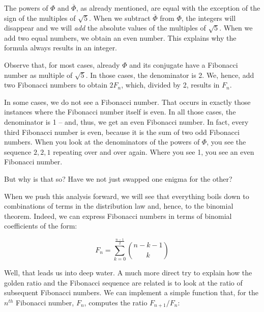 \documentclass[tikz]{scrreprt}
\begin{document}
The powers of $\Phi$ and $\overline{\Phi}$, as already mentioned,
are equal with the exception of the sign of the multiples of $\sqrt{5}$.
When we subtract $\overline{\Phi}$ from $\Phi$, the integers will
disappear and we will \emph{add} the absolute values of the multiples
of $\sqrt{5}$. When we add two equal numbers, we obtain an even number.
This explains why the formula always results in an integer.

Observe that, for most cases, already $\Phi$ and its conjugate
have a Fibonacci number as multiple of $\sqrt{5}$. In those cases,
the denominator is 2. We, hence, add two Fibonacci numbers to obtain
$2F_n$, which, divided by 2, results in $F_n$.

In some cases, we do not see a Fibonacci number. That occurs in
exactly those instances where the Fibonacci number itself is even.
In all those cases,
the denominator is 1 -- and, thus, we get an even Fibonacci number.
In fact, every third Fibonacci number is even, 
because it is the sum
of two odd Fibonacci numbers.
When you look at the denominators of the powers of $\Phi$,
you see the sequence $2, 2, 1$ repeating over and over again.
Where you see 1, you see an even Fibonacci number.

But why is that so? Have we not just swapped one enigma
for the other? 

When we push this analysis forward, we will see
that everything boils down to combinations of terms
in the distribution law and, hence, to the binomial theorem.
Indeed, we can express Fibonacci numbers in terms of 
binomial coefficients of the form:

\begin{equation}
F_n = \sum_{k=0}^{\frac{n-1}{2}}{\binom{n-k-1}{k}}
\end{equation}

Well, that leads us into deep water.
A much more direct try to explain 
how the golden ratio and
the Fibonacci sequence are related
is to look at the ratio of subsequent
Fibonacci numbers.
We can implement a simple function
that, for the $n^{th}$ Fibonacci number, $F_n$,
computes the ratio $F_{n+1}/F_{n}$:
\end{document}
